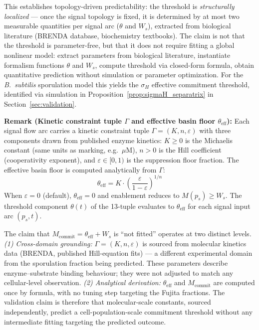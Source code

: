 \documentclass[10pt,letterpaper]{article}
\begin{document}
This establishes topology-driven predictability: the threshold is \textit{structurally localized} --- once the signal topology is fixed, it is determined by at most two measurable quantities per signal arc ($\theta$ and $W_s$), extracted from biological literature (BRENDA database, biochemistry textbooks). The claim is not that the threshold is parameter-free, but that it does not require fitting a global nonlinear model: extract parameters from biological literature, instantiate formalism functions $\theta$ and $W_s$, compute threshold via closed-form formula, obtain quantitative prediction without simulation or parameter optimization. For the \textit{B.~subtilis} sporulation model this yields the $\sigma_H$ effective commitment threshold, identified via simulation in Proposition~\ref{prop:sigmaH_separatrix} in Section~\ref{sec:validation}.

\textbf{Remark (Kinetic constraint tuple $\Gamma$ and effective basin floor $\theta_{\mathrm{eff}}$):}
Each signal flow arc carries a kinetic constraint tuple $\Gamma = (K, n, \varepsilon)$ with three components drawn from published enzyme kinetics:
$K \geq 0$ is the Michaelis constant (same units as marking, e.g.\ $\mu$M),
$n > 0$ is the Hill coefficient (cooperativity exponent), and
$\varepsilon \in [0,1)$ is the suppression floor fraction.
The effective basin floor is computed analytically from $\Gamma$:
\begin{equation}
\theta_{\mathrm{eff}} = K \cdot \left(\frac{\varepsilon}{1 - \varepsilon}\right)^{1/n}
\end{equation}
When $\varepsilon = 0$ (default), $\theta_{\mathrm{eff}} = 0$ and enablement reduces to $M(p_s) \geq W_s$.
The threshold component $\theta(t)$ of the 13-tuple evaluates to $\theta_{\mathrm{eff}}$ for each signal input arc $(p_s, t)$.

The claim that $M_{\mathrm{commit}} = \theta_{\mathrm{eff}} + W_s$ is ``not fitted'' operates at two distinct levels.
\emph{(1) Cross-domain grounding:} $\Gamma = (K, n, \varepsilon)$ is sourced from molecular kinetics data (BRENDA, published Hill-equation fits) --- a different experimental domain from the sporulation fraction being predicted. These parameters describe enzyme--substrate binding behaviour; they were not adjusted to match any cellular-level observation.
\emph{(2) Analytical derivation:} $\theta_{\mathrm{eff}}$ and $M_{\mathrm{commit}}$ are computed once by formula, with no tuning step targeting the Fujita fractions. The validation claim is therefore that molecular-scale constants, sourced independently, predict a cell-population-scale commitment threshold without any intermediate fitting targeting the predicted outcome.
\end{document}

